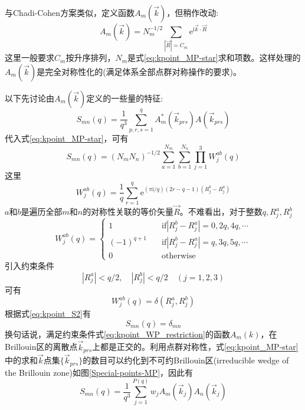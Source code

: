 与\textrm{Chadi-Cohen}方案类似，定义函数$A_m(\vec k)$，但稍作改动:~
\begin{equation}
	A_m(\vec k)=N_m^{-1/2}\sum_{|\vec R|=C_m}\mathrm{e}^{\mathrm{i}\vec k\cdot\vec R}
	\label{eq:kpoint_MP-star}
\end{equation}
这里一般要求$C_m$按升序排列，$N_m$是式\eqref{eq:kpoint_MP-star}求和项数。这样处理的$A_m(\vec k)$是完全对称性化的(满足体系全部点群对称操作的要求)。

以下先讨论由$A_m(\vec k)$定义的一些量的特征:
\begin{equation}
	S_{mn}(q)=\dfrac1{q^3}\sum_{p,r,s=1}^qA_m^{\ast}(\vec k_{prs})A(\vec k_{prs})
	\label{eq:kpoint_S}
\end{equation}
代入式\eqref{eq:kpoint_MP-star}，可有
\begin{equation}
	S_{mn}(q)=(N_mN_n)^{-1/2}\sum_{a=1}^{N_m}\sum_{b=1}^{N_n}\prod_{j=1}^3W_j^{ab}(q)
	\label{eq:kpoint_S2}
\end{equation}
这里$$W_j^{ab}(q)=\dfrac1q\sum_{r=1}^q\mathrm{e}^{(\pi\mathrm{i}/q)(2r-q-1)(R_j^b-R_j^a)}$$
$a$和$b$是遍历全部$m$和$n$的对称性关联的等价矢量$\vec R$。不难看出，对于整数$q,R_j^a,R_j^b$
\begin{equation}
	W_j^{ab}(q)=\left\{
		\begin{aligned}
			1\quad &\mbox{$\mathrm{if} |R_j^b-R_j^a|=0,2q,4q,\cdots$}\\
			(-1)^{q+1}\quad &\mbox{$\mathrm{if} |R_j^b-R_j^a|=q,3q,5q,\cdots$}\\
			0\quad &\mbox{$\mathrm{otherwise}$}
		\end{aligned}\right.
	\label{eq:kpoint_MP_W}
\end{equation}
引入约束条件
\begin{equation}
	|R_j^a|<q/2,\quad|R_j^b|<q/2\quad(j=1,2,3)
	\label{eq:kpoint_WP_restriction}
\end{equation}
可有
\begin{displaymath}
	W_j^{ab}(q)=\delta(R_j^a,R_j^b)
\end{displaymath}
根据式\eqref{eq:kpoint_S2}有
\begin{displaymath}
	S_{mn}(q)=\delta_{mn}
\end{displaymath}
换句话说，满足约束条件式\eqref{eq:kpoint_WP_restriction}的函数$A_m(k)$，在\textrm{Brillouin}区的离散点$\vec k_{prs}$上都是正交的。利用点群对称性，式\eqref{eq:kpoint_MP-star}中的求和$\vec k$点集$\{\vec k_{prs}\}$的数目可以约化到不可约\textrm{Brillouin}区(\textrm{irreducible wedge of the Brillouin zone})如图\ref{Special-points-MP}，因此有
\begin{equation}
	S_{mn}(q)=\dfrac1{q^3}\sum_{j=1}^{P(q)}w_jA_m(\vec k_j)A_n(\vec k_j)
	\label{eq:kpoint_IBZ}
\end{equation}
